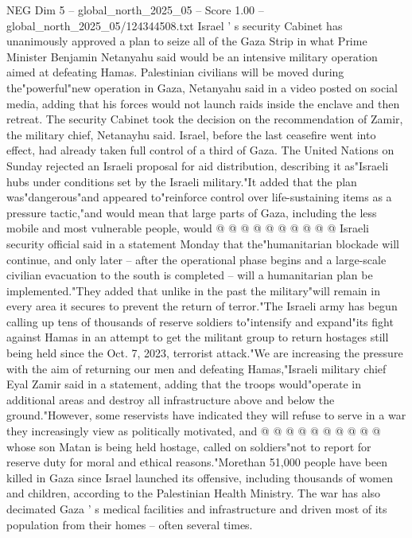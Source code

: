 \begin{textsample}{NEG Dim 5 – global\_north\_2025\_05 – Score 1.00 – global\_north\_2025\_05/124344508.txt}  \label{ex:f5_neg_376}
Israel ' s security Cabinet has unanimously approved a plan to seize all of the Gaza Strip in what Prime Minister Benjamin Netanyahu said would be an intensive military operation aimed at defeating Hamas.
Palestinian civilians will be moved during the"powerful"new operation in Gaza, Netanyahu said in a video posted on social media, adding that his forces would not launch raids inside the enclave and then retreat.
The security Cabinet took the decision on the recommendation of Zamir, the military chief, Netanayhu said.
Israel, before the last ceasefire went into effect, had already taken full control of a third of Gaza.
The United Nations on Sunday rejected an Israeli proposal for aid distribution, describing it as"Israeli hubs under conditions set by the Israeli military."It added that the plan was"dangerous"and appeared to"reinforce control over life-sustaining items as a pressure tactic,"and would mean that large parts of Gaza, including the less mobile and most vulnerable people, would @ @ @ @ @ @ @ @ @ @ Israeli security official said in a statement Monday that the"humanitarian blockade will continue, and only later -- after the operational phase begins and a large-scale civilian evacuation to the south is completed -- will a humanitarian plan be implemented."They added that unlike in the past the military"will remain in every area it secures to prevent the return of terror."The Israeli army has begun calling up tens of thousands of reserve soldiers to"intensify and expand"its fight against Hamas in an attempt to get the militant group to return hostages still being held since the Oct. 7, 2023, terrorist attack."We are increasing the pressure with the aim of returning our men and defeating Hamas,"Israeli military chief Eyal Zamir said in a statement, adding that the troops would"operate in additional areas and destroy all infrastructure above and below the ground."However, some reservists have indicated they will refuse to serve in a war they increasingly view as politically motivated, and @ @ @ @ @ @ @ @ @ @ whose son Matan is being held hostage, called on soldiers"not to report for reserve duty for moral and ethical reasons."Morethan 51,000 people have been killed in Gaza since Israel launched its offensive, including thousands of women and children, according to the Palestinian Health Ministry.
The war has also decimated Gaza ' s medical facilities and infrastructure and driven most of its population from their homes -- often several times.

\end{textsample}
